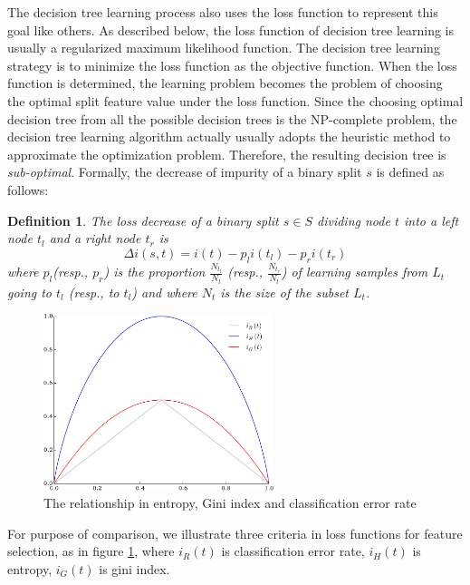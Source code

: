 \documentclass[master]{IPSstyle}
\newtheorem{definition}{Definition}
\begin{document}
{The decision tree learning process also uses the loss function to represent this goal like others. As described below, the loss function of decision tree learning is usually a regularized maximum likelihood function. The decision tree learning strategy is to minimize the loss function as the objective function. When the loss function is determined, the learning problem becomes the problem of choosing the optimal split feature value under the loss function. Since the choosing optimal decision tree from all the possible decision trees is the NP-complete problem, the decision tree learning algorithm actually usually adopts the heuristic method to approximate the optimization problem. Therefore, the resulting decision tree is \emph{sub-optimal}.
Formally, the decrease of impurity of a binary split $s$ is defined as follows:
\begin{definition}\label{def:loss-decrease}
The \emph{loss decrease} of a binary split $s \in S$ dividing node $t$ into
a left node $t_l$ and a right node $t_r$ is
\begin{equation}
\Delta i(s, t) = i(t) - p_l i(t_l) - p_r i(t_r)
\end{equation}
where $p_l$(resp., $p_r$) is the proportion $\tfrac{N_{t_l}}{N_t}$ (resp., $\tfrac{N_{t_r}}{N_t}$)
of learning samples from $L_t$ going to $t_l$ (resp., to $t_l$) and where $N_t$
is the size of the subset $L_t$.
\end{definition}

\begin{figure}[H]
\centering
\includegraphics[width=0.6\textwidth]{figures/ch3_impurity_comparison.pdf}
\caption{The relationship in entropy, Gini index and classification error rate}
\label{fig:3:toy:impurity:comparison}
\end{figure}
For purpose of comparison, we illustrate three criteria in loss functions for feature selection, as in figure \ref{fig:3:toy:impurity:comparison}, where $i_R (t)$ is classification error rate, $i_H (t)$ is entropy, $i_G (t)$ is gini index.

}
\end{document}

